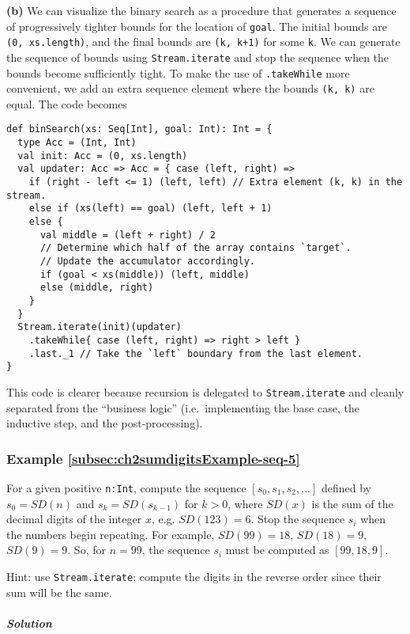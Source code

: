 \textbf{(b)} We can visualize the binary search as a procedure that
generates a sequence of progressively tighter bounds for the location
of \lstinline!goal!. The initial bounds are \lstinline!(0, xs.length)!,
and the final bounds are \lstinline!(k, k+1)! for some \lstinline!k!.
We can generate the sequence of bounds using \lstinline!Stream.iterate!
and stop the sequence when the bounds become sufficiently tight. To
make the use of \lstinline!.takeWhile! more convenient, we add an
extra sequence element where the bounds \lstinline!(k, k)! are equal.
The code becomes
\begin{lstlisting}
def binSearch(xs: Seq[Int], goal: Int): Int = {
  type Acc = (Int, Int)
  val init: Acc = (0, xs.length)
  val updater: Acc => Acc = { case (left, right) =>
    if (right - left <= 1) (left, left) // Extra element (k, k) in the stream.
    else if (xs(left) == goal) (left, left + 1)
    else {
      val middle = (left + right) / 2
      // Determine which half of the array contains `target`.
      // Update the accumulator accordingly.
      if (goal < xs(middle)) (left, middle)
      else (middle, right)
    }
  }
  Stream.iterate(init)(updater)
    .takeWhile{ case (left, right) => right > left }
    .last._1 // Take the `left` boundary from the last element.
}
\end{lstlisting}
This code is clearer because recursion is delegated to \lstinline!Stream.iterate!
and cleanly separated from the ``business logic'' (i.e.~implementing
the base case, the inductive step, and the post-processing).

\subsubsection{Example \label{subsec:ch2sumdigitsExample-seq-5}\ref{subsec:ch2sumdigitsExample-seq-5}}

For a given positive \lstinline!n:Int!, compute the sequence $\left[s_{0},s_{1},s_{2},...\right]$
defined by $s_{0}=SD(n)$ and $s_{k}=SD(s_{k-1})$ for $k>0$, where
$SD(x)$ is the sum of the decimal digits of the integer $x$, e.g.
$SD(123)=6$. Stop the sequence $s_{i}$ when the numbers begin repeating.
For example, $SD(99)=18$, $SD(18)=9$, $SD(9)=9$. So, for $n=99$,
the sequence $s_{i}$ must be computed as $\left[99,18,9\right]$.

Hint: use \lstinline!Stream.iterate!; compute the digits in the reverse
order since their sum will be the same.

\subparagraph{Solution}

